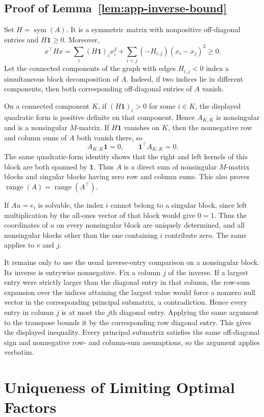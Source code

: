 \documentclass[11pt]{article}
\begin{document}
\subsection{Proof of Lemma~\ref{lem:app-inverse-bound}}
Set $H=\operatorname{sym}(A)$. It is a symmetric matrix with nonpositive off-diagonal entries and $H\mathbf1\geq0$. Moreover,
\[
x^\top Hx
=\sum_i(H\mathbf1)_i x_i^2
 +\sum_{i<j}(-H_{i,j})(x_i-x_j)^2
\geq0.
\]
Let the connected components of the graph with edges $H_{i,j}<0$ index a simultaneous block decomposition of $A$. Indeed, if two indices lie in different components, then both corresponding off-diagonal entries of $A$ vanish.

On a connected component $K$, if $(H\mathbf1)_i>0$ for some $i\in K$, the displayed quadratic form is positive definite on that component. Hence $A_{K,K}$ is nonsingular and is a nonsingular $M$-matrix. If $H\mathbf1$ vanishes on $K$, then the nonnegative row and column sums of $A$ both vanish there, so
\[
A_{K,K}\mathbf1=0,
\qquad
\mathbf1^\top A_{K,K}=0.
\]
The same quadratic-form identity shows that the right and left kernels of this block are both spanned by $\mathbf1$. Thus $A$ is a direct sum of nonsingular $M$-matrix blocks and singular blocks having zero row and column sums. This also proves
$\operatorname{range}(A)=\operatorname{range}(A^\top)$.

If $Au=e_i$ is solvable, the index $i$ cannot belong to a singular block, since left multiplication by the all-ones vector of that block would give $0=1$. Thus the coordinates of $u$ on every nonsingular block are uniquely determined, and all nonsingular blocks other than the one containing $i$ contribute zero. The same applies to $v$ and $j$.

It remains only to use the usual inverse-entry comparison on a nonsingular block. Its inverse is entrywise nonnegative. Fix a column $j$ of the inverse. If a largest entry were strictly larger than the diagonal entry in that column, the row-sum expansion over the indices attaining the largest value would force a nonzero null vector in the corresponding principal submatrix, a contradiction. Hence every entry in column $j$ is at most the $j$th diagonal entry. Applying the same argument to the transpose bounds it by the corresponding row diagonal entry. This gives the displayed inequality. Every principal submatrix satisfies the same off-diagonal sign and nonnegative row- and column-sum assumptions, so the argument applies verbatim.


\section{Uniqueness of Limiting Optimal Factors} \label{app:limiting-factors}
\end{document}
